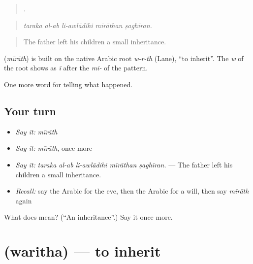 \begin{quote}
    .
\end{quote}

\begin{quote}
\emph{taraka al-ab li-awlādihi mīrāthan ṣaghīran.}
\end{quote}

\begin{quote}
The father left his children a small inheritance.
\end{quote}

\begin{cousinweb}
\textbf{} (\emph{mīrāth}) is built on the native Arabic root \emph{w-r-th} (Lane), \textquotedblleft{}to inherit\textquotedblright{}. The \emph{w} of the root shows as \emph{ī} after the \emph{mi-} of the pattern.
\end{cousinweb}

\begin{grammarlens}[title={What you've built}]
One more word for telling what happened.
\end{grammarlens}

\subsection*{Your turn}
\begin{itemize}
\raggedright
  \item \emph{Say it:} \emph{mīrāth}
  \item \emph{Say it:} \emph{mīrāth}, once more
  \item \emph{Say it:} \emph{taraka al-ab li-awlādihi mīrāthan ṣaghīran.} — The father left his children a small inheritance.
  \item \emph{Recall:} say the Arabic for the eve, then the Arabic for a will, then say \emph{mīrāth} again
\end{itemize}

\begin{tcolorbox}[breakable,colback=teal!4,colframe=teal!35!black,title={Before you move on}]
What does  mean? (\textquotedblleft{}An inheritance\textquotedblright{}.) Say it once more.
\end{tcolorbox}
\section[\texorpdfstring{\ar{ورث} (waritha)}{ورث (waritha)}]{ (waritha) — to inherit}

